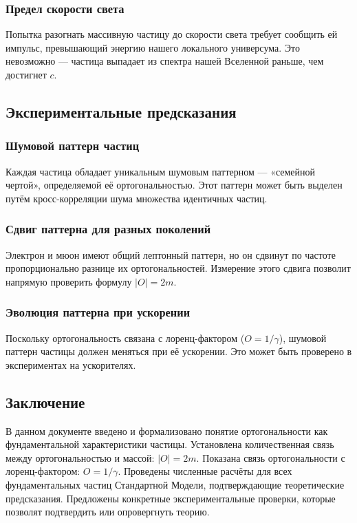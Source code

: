\documentclass[12pt,a4paper]{article}
\begin{document}
\subsubsection{Предел скорости света}
Попытка разогнать массивную частицу до скорости света требует сообщить ей импульс, превышающий энергию нашего локального универсума. Это невозможно --- частица выпадает из спектра нашей Вселенной раньше, чем достигнет $c$.

\subsection{Экспериментальные предсказания}

\subsubsection{Шумовой паттерн частиц}
Каждая частица обладает уникальным шумовым паттерном --- «семейной чертой», определяемой её ортогональностью. Этот паттерн может быть выделен путём кросс-корреляции шума множества идентичных частиц.

\subsubsection{Сдвиг паттерна для разных поколений}
Электрон и мюон имеют общий лептонный паттерн, но он сдвинут по частоте пропорционально разнице их ортогональностей. Измерение этого сдвига позволит напрямую проверить формулу $|O| = 2m$.

\subsubsection{Эволюция паттерна при ускорении}
Поскольку ортогональность связана с лоренц-фактором ($O = 1/\gamma$), шумовой паттерн частицы должен меняться при её ускорении. Это может быть проверено в экспериментах на ускорителях.

\subsection{Заключение}
В данном документе введено и формализовано понятие ортогональности как фундаментальной характеристики частицы. Установлена количественная связь между ортогональностью и массой: $|O| = 2m$. Показана связь ортогональности с лоренц-фактором: $O = 1/\gamma$. Проведены численные расчёты для всех фундаментальных частиц Стандартной Модели, подтверждающие теоретические предсказания. Предложены конкретные экспериментальные проверки, которые позволят подтвердить или опровергнуть теорию.
\end{document}
